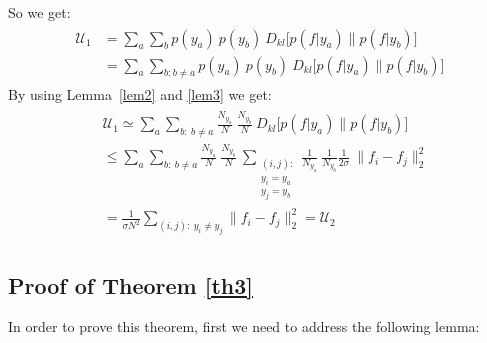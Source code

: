 \documentclass[10pt,journal,compsoc]{IEEEtran}
\begin{document}
So we get:
\begin{align*}
\begin{split}
\mathcal{U}_1 &= \sum_a \sum_b p(y_a)\ p(y_b)\ D_{kl} \big[ p(f|y_a) \| p(f|y_b) \big] \\
&= \sum_a \sum_{b: b\neq a} p(y_a)\ p(y_b)\ D_{kl} \big[ p(f|y_a) \| p(f|y_b) \big] 
\end{split}
\end{align*}%
By using Lemma~\ref{lem2} and \ref{lem3} we get:
\begin{align}
\begin{split}
&\mathcal{U}_1 \simeq \sum_a \sum_{b:\ b\neq a} \frac{N_{y_a}}{N}\ \frac{N_{y_b}}{N}\ D_{kl} \big[ p(f|y_a) \| p(f|y_b) \big] \\
&\leq  \sum_a \sum_{b:\ b\neq a} \frac{N_{y_a}}{N}\ \frac{N_{y_b}}{N}\ \sum_{\substack{(i,j):\\y_i=y_a\\y_j=y_b} }  \frac{1}{N_{y_a}}\ \frac{1}{N_{y_b}} \frac{1}{2\sigma}\ \|f_i-f_j\|_2^2 \\
&= \frac{1}{\sigma N^2} \sum_{(i,j):\ y_i\neq y_j} \|f_i-f_j\|_2^2 = \mathcal{U}_2
\end{split}
\end{align}\subsection{Proof of Theorem \ref{th3}}\label{appendix:B_4}
In order to prove this theorem, first we need to address the following lemma:
\end{document}
